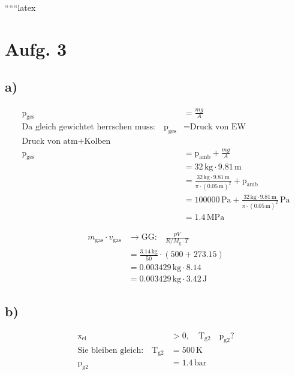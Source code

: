 
``````latex


\section*{Aufg. 3}

\subsection*{a)}

\begin{align*}
\text{p}_{\text{ges}} &= \frac{mg}{A} \\
\text{Da gleich gewichtet herrschen muss:} \quad \text{p}_{\text{ges}} &= \text{Druck von EW} \\
\text{Druck von atm} + \text{Kolben} \\
\text{p}_{\text{ges}} &= \text{p}_{\text{amb}} + \frac{mg}{A} \\
&= 32 \, \text{kg} \cdot 9.81 \, \text{m} \\
&= \frac{32 \, \text{kg} \cdot 9.81 \, \text{m}}{\pi \cdot (0.05 \, \text{m})^2} + \text{p}_{\text{amb}} \\
&= 100000 \, \text{Pa} + \frac{32 \, \text{kg} \cdot 9.81 \, \text{m}}{\pi \cdot (0.05 \, \text{m})^2} \, \text{Pa} \\
&= 1.4 \, \text{MPa}
\end{align*}

\begin{align*}
m_{\text{gas}} \cdot v_{\text{gas}} &\rightarrow \text{GG:} \quad \frac{pV}{R/M_{\text{g}} \cdot T} \\
&= \frac{3.14 \, \text{kg}}{50} \cdot (500 + 273.15) \\
&= 0.003429 \, \text{kg} \cdot 8.14 \\
&= 0.003429 \, \text{kg} \cdot 3.42 \, \text{J}
\end{align*}

\subsection*{b)}

\begin{align*}
\text{x}_{\text{ei}} &> 0, \quad \text{T}_{\text{g2}} \quad \text{p}_{\text{g2}}? \\
\text{Sie bleiben gleich:} \quad \text{T}_{\text{g2}} &= 500 \, \text{K} \\
\text{p}_{\text{g2}} &= 1.4 \, \text{bar}
\end{align*}

